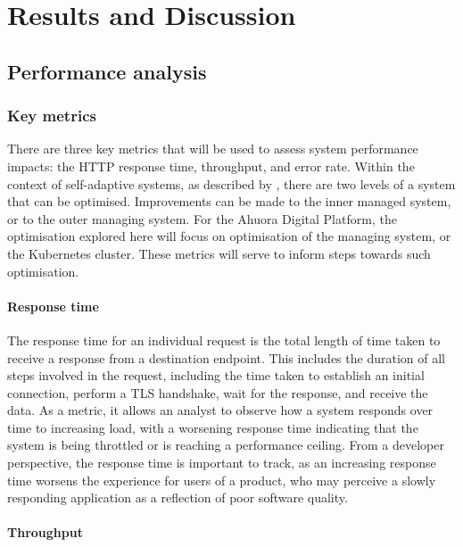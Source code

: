 \chapter{Results and Discussion}

\section{Performance analysis}

\subsection{Key metrics}

There are three key metrics that will be used to assess system performance impacts: the HTTP response time, throughput, and error rate. Within the context of self-adaptive systems, as described by \citeauthor{weyns_engineering_2018} \cite{weyns_engineering_2018}, there are two levels of a system that can be optimised. Improvements can be made to the inner managed system, or to the outer managing system. For the Ahuora Digital Platform, the optimisation explored here will focus on optimisation of the managing system, or the Kubernetes cluster. These metrics will serve to inform steps towards such optimisation.

\subsubsection{Response time}

The response time for an individual request is the total length of time taken to receive a response from a destination endpoint. This includes the duration of all steps involved in the request, including the time taken to establish an initial connection, perform a TLS handshake, wait for the response, and receive the data. As a metric, it allows an analyst to observe how a system responds over time to increasing load, with a worsening response time indicating that the system is being throttled or is reaching a performance ceiling. From a developer perspective, the response time is important to track, as an increasing response time worsens the experience for users of a product, who may perceive a slowly responding application as a reflection of poor software quality.

\subsubsection{Throughput}

